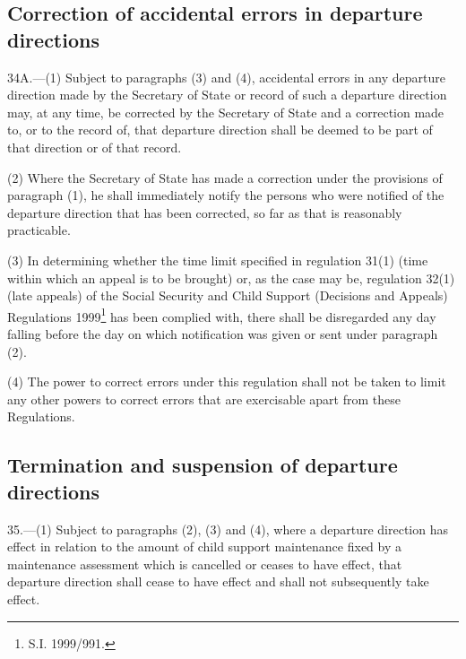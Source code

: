 \documentclass[12pt,a4paper]{article}
\begin{document}
\subsection[34A. Correction of accidental errors in departure directions]{Correction of accidental errors in departure directions}

34A.—(1) Subject to paragraphs (3) and (4), accidental errors in any departure direction made by the Secretary of State or record of such a departure direction may, at any time, be corrected by the Secretary of State and a correction made to, or to the record of, that departure direction shall be deemed to be part of that direction or of that record.

(2) Where the Secretary of State has made a correction under the provisions of paragraph (1), he shall immediately notify the persons who were notified of the departure direction that has been corrected, so far as that is reasonably practicable.

(3) In determining whether the time limit specified in 
regulation 31(1) (time within which an appeal is to be brought) or, as the case may be, regulation 32(1) (late appeals) of the Social Security and Child Support (Decisions and Appeals) Regulations 1999\footnote{\frenchspacing S.I. 1999/991.}  %
has been complied with, there shall be disregarded any day falling before the day on which notification was given or sent under paragraph (2).

(4) The power to correct errors under this regulation shall not be taken to limit any other powers to correct errors that are exercisable apart from these Regulations.


\subsection[35. Termination and suspension of departure directions]{Termination and suspension of departure directions}

35.—(1) Subject to paragraphs (2), (3) and (4), where a departure direction has effect in relation to the amount of child support maintenance fixed by a maintenance assessment which is cancelled or ceases to have effect, that departure direction shall cease to have effect and shall not subsequently take effect.
\end{document}
